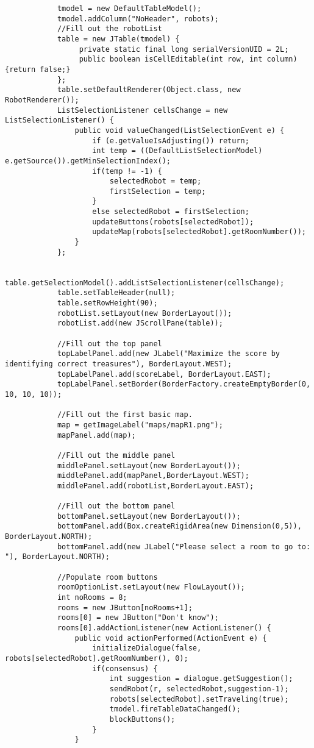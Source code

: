 \begin{lstlisting}
			tmodel = new DefaultTableModel();
			tmodel.addColumn("NoHeader", robots);
			//Fill out the robotList
			table = new JTable(tmodel) {
				 private static final long serialVersionUID = 2L;
				 public boolean isCellEditable(int row, int column) {return false;}
			};
    		table.setDefaultRenderer(Object.class, new RobotRenderer());
    		ListSelectionListener cellsChange = new ListSelectionListener() {
    			public void valueChanged(ListSelectionEvent e) {
    				if (e.getValueIsAdjusting()) return; 
    				int temp = ((DefaultListSelectionModel) e.getSource()).getMinSelectionIndex();
    				if(temp != -1) {
    					selectedRobot = temp;
    					firstSelection = temp;
    				}
    				else selectedRobot = firstSelection;
    				updateButtons(robots[selectedRobot]);
    				updateMap(robots[selectedRobot].getRoomNumber());
    			}
    		};

    		table.getSelectionModel().addListSelectionListener(cellsChange);
    		table.setTableHeader(null);
    		table.setRowHeight(90);
    		robotList.setLayout(new BorderLayout());  
    		robotList.add(new JScrollPane(table));   

			//Fill out the top panel
			topLabelPanel.add(new JLabel("Maximize the score by identifying correct treasures"), BorderLayout.WEST);
			topLabelPanel.add(scoreLabel, BorderLayout.EAST);
			topLabelPanel.setBorder(BorderFactory.createEmptyBorder(0, 10, 10, 10));

			//Fill out the first basic map.
			map = getImageLabel("maps/mapR1.png");
			mapPanel.add(map);

			//Fill out the middle panel
			middlePanel.setLayout(new BorderLayout());
			middlePanel.add(mapPanel,BorderLayout.WEST);
			middlePanel.add(robotList,BorderLayout.EAST);

			//Fill out the bottom panel
			bottomPanel.setLayout(new BorderLayout());
			bottomPanel.add(Box.createRigidArea(new Dimension(0,5)), BorderLayout.NORTH);
			bottomPanel.add(new JLabel("Please select a room to go to: "), BorderLayout.NORTH);
			
			//Populate room buttons
			roomOptionList.setLayout(new FlowLayout());
			int noRooms = 8;
			rooms = new JButton[noRooms+1];
			rooms[0] = new JButton("Don't know");
			rooms[0].addActionListener(new ActionListener() {
				public void actionPerformed(ActionEvent e) {
					initializeDialogue(false, robots[selectedRobot].getRoomNumber(), 0);	
					if(consensus) {
						int suggestion = dialogue.getSuggestion();
						sendRobot(r, selectedRobot,suggestion-1);
						robots[selectedRobot].setTraveling(true);
						tmodel.fireTableDataChanged();
		            	blockButtons();
					}
				}
				

\end{lstlisting}
